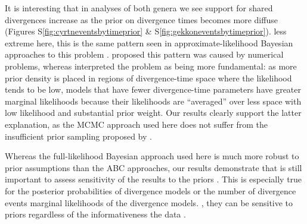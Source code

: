 


It is interesting that in analyses of both genera we see support for shared
divergences increase as the prior on divergence times becomes more diffuse
(Figures
S\ref{fig:cyrtneventsbytimeprior}
\&
S\ref{fig:gekkoneventsbytimeprior}).
 less extreme here, this is the same pattern seen in
approximate-likelihood Bayesian approaches to this problem
\citep{Oaks2012,Hickerson2013,Oaks2014reply}.
\citet{Hickerson2013} proposed this pattern was caused by numerical problems,
whereas \citet{Oaks2014reply} interpreted the problem as being more
fundamental:
as more prior density is placed in regions of divergence-time space where the
likelihood tends to be low, models that have fewer divergence-time parameters
have greater marginal likelihoods because their likelihoods are ``averaged''
over less space with low likelihood and substantial prior weight.
Our results clearly support the latter explanation, as the MCMC approach used
here does not suffer from the insufficient prior sampling proposed by
\citet{Hickerson2013}.

Whereas the full-likelihood Bayesian approach used here is much more robust to
prior assumptions than the ABC approaches, our results demonstrate that  is
still important to assess sensitivity of the results to the priors
\citep{Oaks2012}.
This is especially true for the posterior probabilities of divergence models or
the number of divergence events
marginal likelihoods of the divergence models. 
, they can be sensitive to  priors regardless of the
informativeness the data \citep{Oaks2018marginal}.

